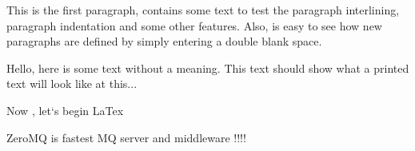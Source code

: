\documentclass{article}
\begin{document}
This is the first paragraph, contains some text to test the paragraph
interlining, paragraph indentation and some other features. Also, is 
easy to see how new paragraphs are defined by simply entering a double 
blank space.
 
Hello,  here  is  some  text  without  a  meaning.   This  text  should
show what a printed text will look like at this... 

\clearpage
Now , let`s begin LaTex

\newpage
ZeroMQ is fastest MQ server and middleware !!!!
\end{document}
